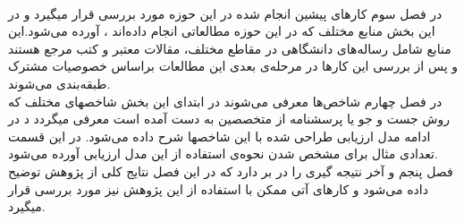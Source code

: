 \\ 
در فصل سوم کارهای پیشین انجام شده در این حوزه مورد بررسی قرار میگیرد و در این بخش  منابع مختلف که در این حوزه مطالعاتی انجام داده‌اند ، آورده می‌شود.این منابع شامل رساله‌های دانشگاهی در مقاطع مختلف، مقالات معتبر و کتب مرجع هستند و پس از  بررسی این کارها در مرحله‌ی بعدی این مطالعات براساس خصوصیات مشترک طبقه‌بندی می‌شوند.
\\
در فصل چهارم شاخص‌ها معرفی می‌شوند در ابتدای این بخش شاخصهای مختلف که روش جست و جو یا پرسشنامه از متخصصین به دست آمده است معرفی میگردد د در ادامه مدل ارزیابی طراحی شده با این شاخصها   شرح داده می‌شود. در این قسمت تعدادی مثال برای مشخص شدن نحوه‌ی استفاده از این مدل ارزیابی آورده می‌شود.
\\
فصل پنجم و آخر نتیجه گیری را   در بر دارد که در این فصل نتایج کلی از پژوهش توضیح داده می‌شود و کارهای آتی ممکن با استفاده از این پژوهش نیز مورد بررسی قرار میگیرد. 